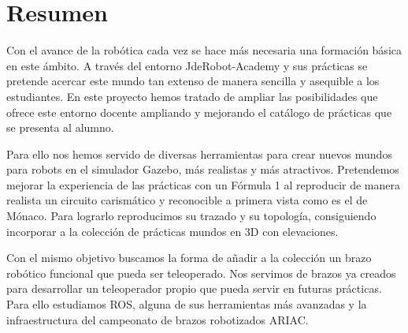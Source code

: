 \chapter*{Resumen} %


Con el avance de la robótica cada vez se hace más necesaria una formación básica en este ámbito. A través del entorno JdeRobot-Academy y sus prácticas se pretende acercar este mundo tan extenso de manera sencilla y asequible a los estudiantes. En este proyecto hemos tratado de ampliar las posibilidades que ofrece este entorno docente ampliando y mejorando el catálogo de prácticas que se presenta al alumno.

Para ello nos hemos servido de diversas herramientas para crear nuevos mundos para robots en el simulador Gazebo, más realistas y más atractivos. Pretendemos mejorar la experiencia de las prácticas con un Fórmula 1 al reproducir de manera realista un circuito carismático y reconocible a primera vista como es el de Mónaco. Para lograrlo reproducimos su trazado y su topología, consiguiendo incorporar a la colección de prácticas mundos en 3D con elevaciones.

Con el mismo objetivo buscamos la forma de añadir a la colección un brazo robótico funcional que pueda ser teleoperado. Nos servimos de brazos ya creados para desarrollar un teleoperador propio que pueda servir en futuras prácticas. Para ello estudiamos ROS, alguna de sus herramientas más avanzadas y la infraestructura del campeonato de brazos robotizados ARIAC.
